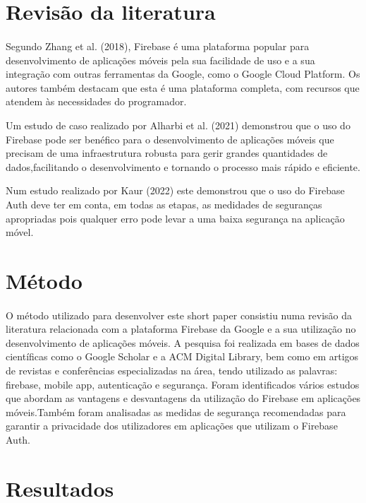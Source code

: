 \documentclass[runningheads]{llncs}
\begin{document}
\section{Revisão da literatura}
\paragraph{}
Segundo Zhang et al. (2018), Firebase é uma plataforma popular para desenvolvimento de aplicações móveis pela sua facilidade de uso e a sua integração com outras ferramentas da Google, como o Google Cloud Platform. Os autores também destacam que esta é uma plataforma completa, com recursos que atendem às necessidades do programador.\cite{2}

Um estudo de caso realizado por Alharbi et al. (2021) demonstrou que o uso do Firebase pode ser benéfico para o desenvolvimento de aplicações móveis que precisam de uma infraestrutura robusta para gerir grandes quantidades de dados,facilitando o desenvolvimento e tornando o processo mais rápido e eficiente.

Num estudo realizado por Kaur (2022) este demonstrou que o uso do Firebase Auth deve ter em conta, em todas as etapas, as medidades de seguranças apropriadas pois qualquer erro pode levar a uma baixa segurança na aplicação móvel.\cite{3}



\section{Método}
\paragraph{}
O método utilizado para desenvolver este short paper consistiu numa revisão da literatura relacionada com a plataforma Firebase da Google e a sua utilização no desenvolvimento de aplicações móveis. A pesquisa foi realizada em bases de dados científicas como o Google Scholar e a ACM Digital Library, bem como em artigos de revistas e conferências especializadas na área, tendo utilizado as palavras: firebase, mobile app, autenticação e segurança. Foram identificados vários estudos que abordam as vantagens e desvantagens da utilização do Firebase em aplicações móveis.\cite{4}Também foram analisadas as medidas de segurança recomendadas para garantir a privacidade dos utilizadores em aplicações que utilizam o Firebase Auth.\cite{5}

\section{Resultados}
\end{document}
